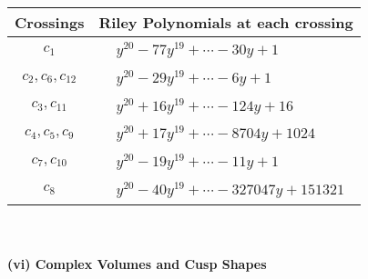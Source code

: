 \documentclass[1p]{elsarticle_modified}
\theoremstyle{definition}
\begin{document}
\begin{tabular}{m{50pt}|m{274pt}}
Crossings & \hspace{64pt}Riley Polynomials at each crossing \\
\hline $$\begin{aligned}c_{1}\end{aligned}$$&$\begin{aligned}
&y^{20}-77 y^{19}+\cdots-30 y+1
\end{aligned}$\\
\hline $$\begin{aligned}c_{2},c_{6},c_{12}\end{aligned}$$&$\begin{aligned}
&y^{20}-29 y^{19}+\cdots-6 y+1
\end{aligned}$\\
\hline $$\begin{aligned}c_{3},c_{11}\end{aligned}$$&$\begin{aligned}
&y^{20}+16 y^{19}+\cdots-124 y+16
\end{aligned}$\\
\hline $$\begin{aligned}c_{4},c_{5},c_{9}\end{aligned}$$&$\begin{aligned}
&y^{20}+17 y^{19}+\cdots-8704 y+1024
\end{aligned}$\\
\hline $$\begin{aligned}c_{7},c_{10}\end{aligned}$$&$\begin{aligned}
&y^{20}-19 y^{19}+\cdots-11 y+1
\end{aligned}$\\
\hline $$\begin{aligned}c_{8}\end{aligned}$$&$\begin{aligned}
&y^{20}-40 y^{19}+\cdots-327047 y+151321
\end{aligned}$\\
\hline
\end{tabular}\\~\\
\newpage\flushleft \textbf{(vi) Complex Volumes and Cusp Shapes}
\end{document}
